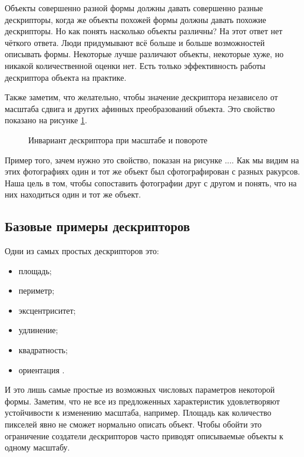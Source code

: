 Объекты совершенно разной формы должны давать совершенно разные дескрипторы, когда же объекты похожей формы должны давать похожие дескрипторы. Но как понять насколько объекты различны? На этот ответ нет чёткого ответа. Люди придумывают всё больше и больше возможностей описывать формы. Некоторые лучше различают объекты, некоторые хуже, но никакой количественной оценки нет. Есть только эффективность работы дескриптора объекта на практике.

Также заметим, что желательно, чтобы значение дескриптора независело от масштаба сдвига и других афинных преобразований объекта\cite{azadeh2013lecture}. Это свойство показано на рисунке \ref{img:descriptor_invariant}.

\begin{figure}[H]
	\centering
	
	\caption{Инвариант дескриптора при масштабе и повороте}
	\label{img:descriptor_invariant}
\end{figure}

Пример того, зачем нужно это свойство, показан на рисунке .... Как мы видим на этих фотографиях один и тот же объект был сфотографирован с разных ракурсов. Наша цель в том, чтобы сопоставить фотографии друг с другом и понять, что на них находиться один и тот же объект.


\subsection{Базовые примеры дескрипторов}

Одни из самых простых дескрипторов это:
\begin{itemize}
	\item площадь;
	\item периметр;
	\item эксцентриситет;
	\item удлинение;
	\item квадратность;
	\item ориентация \cite{morse2000lecture}.
\end{itemize}

И это лишь самые простые из возможных числовых параметров некоторой формы. Заметим, что не все из предложенных характеристик удовлетворяют устойчивости к изменению масштаба, например. Площадь как количество пикселей явно не сможет нормально описать объект. Чтобы обойти это ограничение создатели дескрипторов часто приводят описываемые объекты к одному масштабу.

